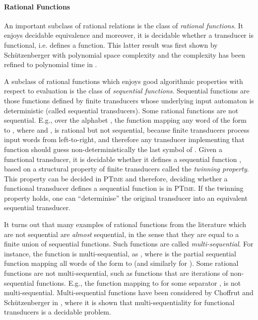 \documentclass[envcountsame]{llncs}
\begin{document}
\paragraph{Rational Functions} An important subclass of rational relations is the class of
\emph{rational functions}.  It enjoys decidable
equivalence and moreover, it is decidable whether a transducer
is functional, i.e. defines a function. This latter result was first shown by 
Sch\"utzenberger with polynomial space complexity \cite{Schutz75} and the complexity has been refined to
polynomial time in \cite{GurIba83,BealCPS03}.


A subclass of rational functions which enjoys good algorithmic
properties with respect to evaluation is the class of \emph{sequential
  functions}. Sequential functions are those functions defined by 
finite transducers whose underlying input automaton is deterministic
(called sequential transducers). Some rational functions are not
sequential. E.g., over the alphabet , the 
function  mapping any word of the form  to , where
 and , is rational but not sequential,
because finite transducers process input words from left-to-right, and
therefore any transducer implementing that function should
 guess non-deterministically the last symbol of . 
Given a functional transducer, it is decidable whether it defines a
sequential function \cite{DBLP:journals/tcs/Choffrut77}, based on a
structural property of finite transducers called the \emph{twinning
  property}. This property can be decided in \textsc{PTime}
\cite{BealCPS03} and therefore, deciding whether a functional
transducer defines a sequential function is in
\textsc{PTime}. If the twinning property holds, one can
``determinise'' the original transducer into an equivalent sequential
transducer. 



It turns out that many examples of rational functions from the
literature which are not sequential are \emph{almost} sequential, in
the sense that they are equal to a finite union of sequential
functions. Such functions are called \emph{multi-sequential}. 
For instance, the function  is multi-sequential, as
, where  is
the partial sequential function mapping all words of the form  to
 (and similarly for ). Some rational functions are not
multi-sequential,  such as functions that are iterations of non-sequential functions. E.g., the function 
mapping  to  for some separator , is not multi-sequential. 
Multi-sequential functions have been
considered by Choffrut and
Sch\"utzenberger in \cite{DBLP:conf/stacs/ChoffrutS86}, where it is shown
that multi-sequentiality for functional transducers is a decidable
problem. 
\end{document}

